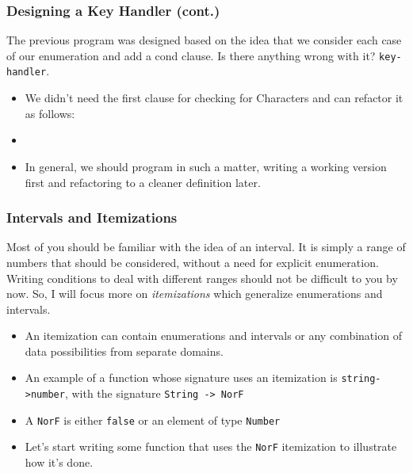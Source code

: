 \documentclass{beamer}
\begin{document}

\begin{frame}
  \frametitle{Designing a Key Handler (cont.)}
  The previous program was designed based on the idea that we
  consider each case of our enumeration and add a cond clause.
  Is there anything wrong with it?
  \texttt{key-handler}.
  \begin{itemize}
  \item<2-> We didn't need the first clause for checking for Characters
    and can refactor it as follows:
  \item<3-> \keNew
  \item<4-> In general, we should program in such a matter, writing
    a working version first and refactoring to a cleaner definition later.
  \end{itemize}
\end{frame}

\begin{frame}
  \frametitle{Intervals and Itemizations}
  Most of you should be familiar with the idea of an interval. It is simply
  a range of numbers that should be considered, without a need for
  explicit enumeration.
  Writing conditions to deal
  with different ranges should not be difficult to you by now. So, I will
  focus more on \emph{itemizations} which generalize enumerations and intervals.
  \begin{itemize}
  \item<2-> An itemization can contain enumerations and intervals or any
    combination of data possibilities from separate domains.
  \item<3-> An example of a function whose signature uses an
    itemization is \texttt{string->number}, with
    the signature \texttt{String -> NorF}
  \item<4-> A \texttt{NorF} is either \texttt{false}
    or an element of type \texttt{Number}
  \item<5-> Let's start writing some function that uses the \texttt{NorF} itemization to illustrate how it's done.
  \end{itemize}
\end{frame}
\end{document}
